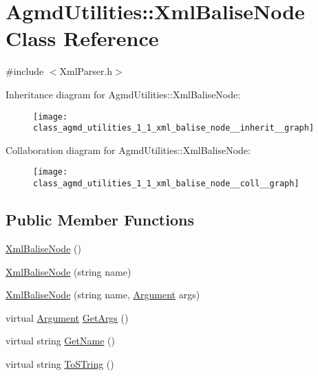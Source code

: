 \hypertarget{class_agmd_utilities_1_1_xml_balise_node}{\section{Agmd\+Utilities\+:\+:Xml\+Balise\+Node Class Reference}
\label{class_agmd_utilities_1_1_xml_balise_node}
}


{\ttfamily \#include $<$Xml\+Parser.\+h$>$}



Inheritance diagram for Agmd\+Utilities\+:\+:Xml\+Balise\+Node\+:\nopagebreak
\begin{figure}[H]
\begin{center}
\leavevmode
\texttt{[image: class\_agmd\_utilities\_1\_1\_xml\_balise\_node\_\_inherit\_\_graph]}
\end{center}
\end{figure}


Collaboration diagram for Agmd\+Utilities\+:\+:Xml\+Balise\+Node\+:\nopagebreak
\begin{figure}[H]
\begin{center}
\leavevmode
\texttt{[image: class\_agmd\_utilities\_1\_1\_xml\_balise\_node\_\_coll\_\_graph]}
\end{center}
\end{figure}
\subsection*{Public Member Functions}
\begin{DoxyCompactItemize}
\item 
\hyperlink{class_agmd_utilities_1_1_xml_balise_node_a4ec31b7a44bd8ad85da2db8c05e46774}{Xml\+Balise\+Node} ()
\item 
\hyperlink{class_agmd_utilities_1_1_xml_balise_node_aba0cece5472dd4a3a23822d807ba84f7}{Xml\+Balise\+Node} (string name)
\item 
\hyperlink{class_agmd_utilities_1_1_xml_balise_node_abd69ca34bb878ccbb5f399e5afd3d4c1}{Xml\+Balise\+Node} (string name, \hyperlink{namespace_agmd_utilities_a93ce0bfe1d978003fb0319f5b3763e2c}{Argument} args)
\item 
virtual \hyperlink{namespace_agmd_utilities_a93ce0bfe1d978003fb0319f5b3763e2c}{Argument} \hyperlink{class_agmd_utilities_1_1_xml_balise_node_aa128f9076fc38c9cca05f628ef0eaf2c}{Get\+Args} ()
\item 
virtual string \hyperlink{class_agmd_utilities_1_1_xml_balise_node_a91c977e870558bed5f895fce2f6f36a2}{Get\+Name} ()
\item 
virtual string \hyperlink{class_agmd_utilities_1_1_xml_balise_node_a6e6275c37594b92185f3fec4bcd85f2d}{To\+S\+Tring} ()
\end{DoxyCompactItemize}
